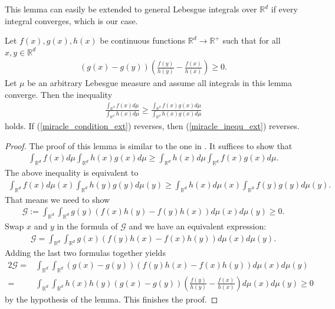 \documentclass[10pt]{article}
\begin{document}
This lemma can easily be extended to general Lebesgue integrals over $\mathbb{R}^d$ if every integral converges, which is our case.
\begin{lemma} \label{miracle_lemma_ext}
    Let $f(x),g(x),h(x)$ be continuous functions $\mathbb{R}^d \to \mathbb{R}^+$ such that for all $x,y \in \mathbb{R}^d$
    \begin{align} \label{miracle_condition_ext}
        \left(g(x)-g(y)\right)\left(\frac{f(y)}{h(y)}-\frac{f(x)}{h(x)}\right) \geq 0.
    \end{align}
    Let $\mu$ be an arbitrary Lebesgue measure and assume all integrals in this lemma converge. Then the inequality
    \begin{align} \label{miracle_inequ_ext}
        \frac{\int_{\mathbb{R}^d} f(x)d\mu}{\int_{\mathbb{R}^d} h(x)d\mu} \geq \frac{\int_{\mathbb{R}^d} f(x)g(x)d\mu}{\int_{\mathbb{R}^d} h(x)g(x)d\mu}
    \end{align}
    holds. If (\ref{miracle_condition_ext}) reverses, then (\ref{miracle_inequ_ext}) reverses.
\end{lemma}
\begin{proof}
    The proof of this lemma is similar to the one in \citep{liu2000inequ}. It suffices to show that
    \begin{align}
        \int_{\mathbb{R}^d} f(x)d\mu \int_{\mathbb{R}^d} h(x)g(x)d\mu \geq \int_{\mathbb{R}^d} h(x)d\mu \int_{\mathbb{R}^d} f(x)g(x)d\mu.
    \end{align}
    The above inequality is equivalent to
    \begin{align}
        \int_{\mathbb{R}^d} f(x)d\mu(x) \int_{\mathbb{R}^d} h(y)g(y)d\mu(y) \geq \int_{\mathbb{R}^d} h(x)d\mu(x) \int_{\mathbb{R}^d} f(y)g(y)d\mu(y).
    \end{align}
    That means we need to show
    \begin{align}
        \mathcal{G}:=\int_{\mathbb{R}^d} \int_{\mathbb{R}^d} g(y)(f(x)h(y)-f(y)h(x))d\mu(x)d\mu(y) \geq 0.
    \end{align}
    Swap $x$ and $y$ in the formula of $\mathcal{G}$ and we have an equivalent expression:
    \begin{align}
        \mathcal{G}=\int_{\mathbb{R}^d} \int_{\mathbb{R}^d} g(x)(f(y)h(x)-f(x)h(y))d\mu(x)d\mu(y).
    \end{align}
    Adding the last two formulas together yields
    \begin{align}
        2\mathcal{G} = & \int_{\mathbb{R}^d} \int_{\mathbb{R}^d} (g(x)-g(y))(f(y)h(x)-f(x)h(y))d\mu(x)d\mu(y) \nonumber                                              \\
        =              & \int_{\mathbb{R}^d} \int_{\mathbb{R}^d} h(x)h(y)\left(g(x)-g(y)\right)\left(\frac{f(y)}{h(y)}-\frac{f(x)}{h(x)}\right)d\mu(x)d\mu(y) \geq 0
    \end{align}
    by the hypothesis of the lemma. This finishes the proof.
\end{proof}
\end{document}
